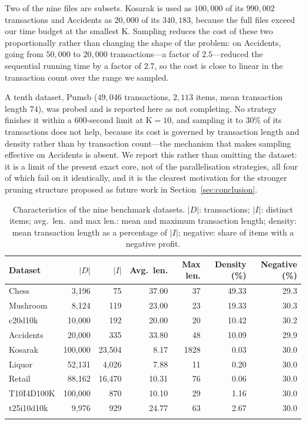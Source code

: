 \documentclass[pdflatex,sn-vancouver-num]{sn-jnl}
\theoremstyle{thmstyleone}%
\theoremstyle{thmstyletwo}%
\theoremstyle{thmstylethree}%
\newcommand{\Kk}{\mathrm{K}}
\begin{document}
Two of the nine files are subsets. Kosarak is used as $100{,}000$ of its
$990{,}002$ transactions and Accidents as $20{,}000$ of its $340{,}183$,
because the full files exceed our time budget at the smallest $\Kk$.
Sampling reduces the cost of these two proportionally rather than
changing the shape of the problem: on Accidents, going from
$50{,}000$ to $20{,}000$ transactions---a factor of $2.5$---reduced the
sequential running time by a factor of $2.7$, so the cost is close to
linear in the transaction count over the range we sampled.
 
A tenth dataset, Pumsb ($49{,}046$ transactions, $2{,}113$ items, mean
transaction length $74$), was probed and is reported here as not
completing. No strategy finishes it within a $600$-second limit at
$\Kk=10$, and sampling it to $30\%$ of its transactions does not help,
because its cost is governed by transaction length and density rather
than by transaction count---the mechanism that makes sampling effective
on Accidents is absent. We report this rather than omitting the dataset:
it is a limit of the present exact core, not of the parallelisation
strategies, all four of which fail on it identically, and it is the
clearest motivation for the stronger pruning structure proposed as future
work in Section~\ref{sec:conclusion}.
 
\begin{table}[t]
\caption{Characteristics of the nine benchmark datasets. $|D|$: transactions;
$|I|$: distinct items; avg.\ len.\ and max len.: mean and maximum transaction
length; density: mean transaction length as a percentage of $|I|$;
negative: share of items with a negative profit.}\label{tab:datasets}
\footnotesize\setlength{\tabcolsep}{5pt}
\begin{tabular}{@{}lrrrrrr@{}}
\toprule
Dataset & $|D|$ & $|I|$ & Avg.\ len. & Max len. & Density (\%) & Negative (\%) \\
\midrule
Chess      & 3{,}196   & 75        & 37.00 & 37   & 49.33 & 29.3 \\
Mushroom   & 8{,}124   & 119       & 23.00 & 23   & 19.33 & 30.3 \\
c20d10k    & 10{,}000  & 192       & 20.00 & 20   & 10.42 & 30.2 \\
Accidents  & 20{,}000  & 335       & 33.80 & 48   & 10.09 & 29.9 \\
Kosarak    & 100{,}000 & 23{,}504  & 8.17  & 1828 & 0.03  & 30.0 \\
Liquor     & 52{,}131  & 4{,}026   & 7.88  & 11   & 0.20  & 30.0 \\
Retail     & 88{,}162  & 16{,}470  & 10.31 & 76   & 0.06  & 30.0 \\
T10I4D100K & 100{,}000 & 870       & 10.10 & 29   & 1.16  & 30.0 \\
t25i10d10k & 9{,}976   & 929       & 24.77 & 63   & 2.67  & 30.0 \\
\botrule
\end{tabular}
\end{table}
 
\end{document}
